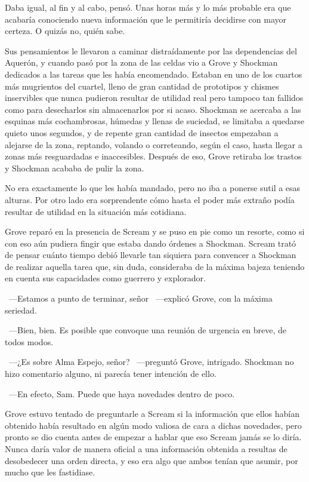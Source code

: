 Daba igual, al fin y al cabo, pensó. Unas horas más y lo más probable era que acabaría conociendo nueva información que le permitiría decidirse con mayor certeza. O quizás no, quién sabe.

Sus pensamientos le llevaron a caminar distraídamente por las dependencias del Aquerón, y cuando pasó por la zona de las celdas vio a Grove y Shockman dedicados a las tareas que les había encomendado. Estaban en uno de los cuartos más mugrientos del cuartel, lleno de gran cantidad de prototipos y chismes inservibles que nunca pudieron resultar de utilidad real pero tampoco tan fallidos como para desecharlos sin almacenarlos por si acaso. Shockman se acercaba a las esquinas más cochambrosas, húmedas y llenas de suciedad, se limitaba a quedarse quieto unos segundos, y de repente gran cantidad de insectos empezaban a alejarse de la zona, reptando, volando o correteando, según el caso, hasta llegar a zonas más resguardadas e inaccesibles. Después de eso, Grove retiraba los trastos y Shockman acababa de pulir la zona.

No era exactamente lo que les había mandado, pero no iba a ponerse sutil a esas alturas. Por otro lado era sorprendente cómo hasta el poder más extraño podía resultar de utilidad en la situación más cotidiana.

Grove reparó en la presencia de Scream y se puso en pie como un resorte, como si con eso aún pudiera fingir que estaba dando órdenes a Shockman. Scream trató de pensar cuánto tiempo debió llevarle tan siquiera para convencer a Shockman de realizar aquella tarea que, sin duda, consideraba de la máxima bajeza teniendo en cuenta sus capacidades como guerrero y explorador.

~---Estamos a punto de terminar, señor ~---explicó Grove, con la máxima seriedad.

~---Bien, bien. Es posible que convoque una reunión de urgencia en breve, de todos modos.

~---¿Es sobre Alma Espejo, señor? ~---preguntó Grove, intrigado. Shockman no hizo comentario alguno, ni parecía tener intención de ello.

~---En efecto, Sam. Puede que haya novedades dentro de poco.

Grove estuvo tentado de preguntarle a Scream si la información que ellos habían obtenido había resultado en algún modo valiosa de cara a dichas novedades, pero pronto se dio cuenta antes de empezar a hablar que eso Scream jamás se lo diría. Nunca daría valor de manera oficial a una información obtenida a resultas de desobedecer una orden directa, y eso era algo que ambos tenían que asumir, por mucho que les fastidiase.

